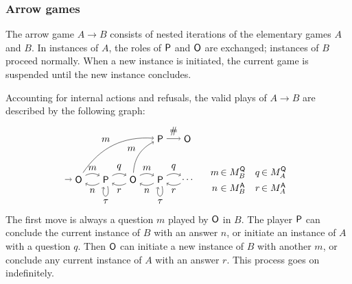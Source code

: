 \subsubsection{Arrow games}
\label{sec:arrow}

The arrow game $A \rightarrow B$ consists of
nested iterations of the elementary games $A$ and $B$.
In instances of $A$, the roles of $ \mathsf{P} $ and $ \mathsf{O} $ are exchanged;
instances of $B$ proceed normally.
When a new instance is initiated,
the current game is suspended
until the new instance concludes.

Accounting for internal actions and refusals,
the valid plays of $A \rightarrow B$
are described by the following graph:
\[
  \begin{tikzpicture}[baseline=(O1.base)]
    \node (O1) at (0,0) {\kw{O}};
    \node (P1) at (1,0) {\kw{P}};
    \node (O2) at (2,0) {\kw{O}};
    \node (P2) at (3,0) {\kw{P}};
    \node (O3) at (4,0) {$\ldots$};
    \node (R) at (3,1.5) {\kw{P}};
    \node (H) at (4,1.5) {$\kw{O}$};
    \path [->] (R) edge node[auto] {$\#$} (H);
    \path [->] (-0.5,0) edge (O1);
    \path [->] (O1) edge[bend left] node[auto] {$m$} (P1);
    \path [->] (O1) edge[bend left] node[auto] {$m$} (R);
    \path [->] (P1) edge[bend left] node[auto] {$n$} (O1);
    \path [->] (P1) edge[bend left] node[auto] {$q$} (O2);
    \path [->] (P1) edge[loop below] node[auto] {$\tau$} (P1);
    \path [->] (O2) edge[bend left] node[auto] {$r$} (P1);
    \path [->] (O2) edge[bend left] node[auto] {$m$} (P2);
    \path [->] (O2) edge[bend left] node[auto] {$m$} (R);
    \path [->] (P2) edge[bend left] node[auto] {$n$} (O2);
    \path [->] (P2) edge[bend left] node[auto] {$q$} (O3);
    \path [->] (P2) edge[loop below] node[auto] {$\tau$} (P2);
    \path [->] (O3) edge[bend left] node[auto] {$r$} (P2);
  \end{tikzpicture}
  \quad
  \begin{array}{c@{\,}lc@{\,}l}
    m &\in M_B^\kw{Q} & q &\in M_A^\kw{Q} \\[1ex]
    n &\in M_B^\kw{A} & r &\in M_A^\kw{A}
  \end{array}
\]
The first move is always a question $m$ played by $ \mathsf{O} $ in $B$.
The player $ \mathsf{P} $ can conclude the current instance of $B$
with an answer $n$, or
initiate an instance of $A$
with a question $q$.
Then $ \mathsf{O} $ can initiate a new instance of $B$
with another $m$, or
conclude any current instance of $A$
with an answer $r$.
This process goes on indefinitely.


